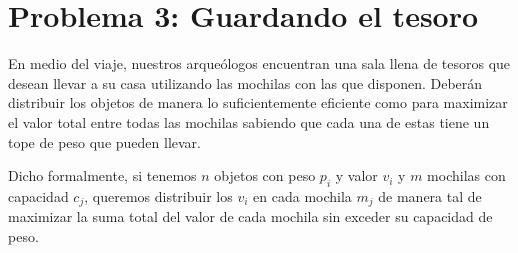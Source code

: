 \section{Problema 3: Guardando el tesoro}

En medio del viaje, nuestros arqueólogos encuentran una sala llena de tesoros que desean llevar a su casa utilizando las mochilas con las que disponen. Deberán distribuir los objetos de manera lo suficientemente eficiente como para maximizar el valor total entre todas las mochilas sabiendo que cada una de estas tiene un tope de peso que pueden llevar.

Dicho formalmente, si tenemos $n$ objetos con peso $p_i$ y valor $v_i$ y $m$ mochilas con capacidad $c_j$, queremos distribuir los $v_i$ en cada mochila $m_j$ de manera tal de maximizar la suma total del valor de cada mochila sin exceder su capacidad de peso.